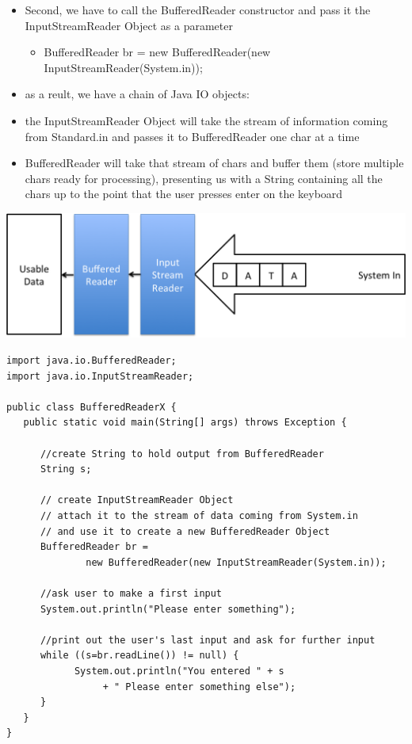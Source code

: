 \documentclass{beamer}
\begin{document}
\begin{frame}
\begin{itemize}
\item Second, we have to call the BufferedReader constructor and pass it the InputStreamReader Object as a parameter
\begin{itemize}
\tiny
\item BufferedReader br = new BufferedReader(new InputStreamReader(System.in));
\end{itemize}
\item as a reult, we have a chain of Java IO objects: 
\item the InputStreamReader Object will take the stream of information coming from Standard.in and passes it to BufferedReader one char at a time
\item BufferedReader will take that stream of chars and buffer them (store multiple chars ready for processing), presenting us with a String containing  all the chars up to the point that the user presses enter on the keyboard
\end{itemize}
\end{frame}

\begin{frame}
\includegraphics[scale=0.5]{Stream3.png}
\end{frame}

\scriptsize
\begin{frame}[fragile]
\begin{block}{}
\begin{lstlisting}
import java.io.BufferedReader;
import java.io.InputStreamReader;

public class BufferedReaderX {
   public static void main(String[] args) throws Exception {

	  //create String to hold output from BufferedReader
	  String s;
      
      // create InputStreamReader Object
      // attach it to the stream of data coming from System.in
      // and use it to create a new BufferedReader Object
      BufferedReader br = 
              new BufferedReader(new InputStreamReader(System.in));
      
      //ask user to make a first input 
      System.out.println("Please enter something");
      
      //print out the user's last input and ask for further input
      while ((s=br.readLine()) != null) {
            System.out.println("You entered " + s 
                 + " Please enter something else");
      }       
   }
}
\end{lstlisting}
\end{block}
\end{frame}
\end{document}
